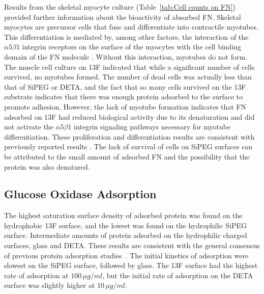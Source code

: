 Results from the skeletal myocyte culture (Table~\ref{tab:Cell counts on FN})
provided further information about the bioactivity of absorbed FN.
Skeletal myocytes are precursor cells that fuse and differentiate
into contractile myotubes. This differentiation is mediated by, among
other factors, the interaction of the $\alpha5\beta1$ integrin receptors
on the surface of the myocytes with the cell binding domain of the
FN molecule \cite{Michael2003}. Without this interaction, myotubes
do not form. The muscle cell culture on 13F indicated that while a
significant number of cells survived, no myotubes formed. The number
of dead cells was actually less than that of SiPEG or DETA, and the
fact that so many cells survived on the 13F substrate indicates that
there was enough protein adsorbed to the surface to promote adhesion.
However, the lack of myotube formation indicates that FN adsorbed
on 13F had reduced biological activity due to its denaturation and
did not activate the $\alpha5\beta1$ integrin signaling pathways
necessary for myotube differentiation. These proliferation and differentiation
results are consistent with previously reported results \cite{Michael2003}.
The lack of survival of cells on SiPEG surfaces can be attributed
to the small amount of adsorbed FN and the possibility that the protein
was also denatured. 


\subsection{Glucose Oxidase Adsorption}

The highest saturation surface density of adsorbed protein was found
on the hydrophobic 13F surface, and the lowest was found on the hydrophilic
SiPEG surface. Intermediate amounts of protein adsorbed on the hydrophilic
charged surfaces, glass and DETA. These results are consistent with
the general consensus of previous protein adsorption studies~\cite{Rabe2010}.
The initial kinetics of adsorption were slowest on the SiPEG surface,
followed by glass. The 13F surface had the highest rate of adsorption
at $100\,\mu g/ml$, but the initial rate of adsorption on the DETA
surface was slightly higher at $10\,\mu g/ml$.


